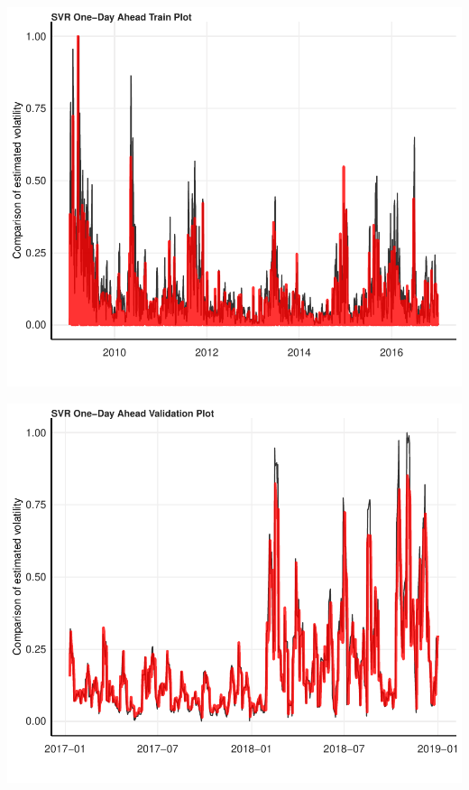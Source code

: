 \documentclass[11pt,preprint, authoryear]{elsarticle}
\let\origfigure\figure
\let\endorigfigure\endfigure
\renewenvironment{figure}[1][2] {
    \expandafter\origfigure\expandafter[H]
} {
    \endorigfigure
}
\numberwithin{equation}{section}
\numberwithin{figure}{section}
\numberwithin{table}{section}
\begin{document}
\begin{figure}[H]

{\centering \includegraphics{Essay_files/figure-latex/plot_5-1} 

}

\caption{SVR One-Day Ahead Training Forecast}\label{fig:plot_5}
\end{figure}

\begin{figure}[H]

{\centering \includegraphics{Essay_files/figure-latex/plot_6-1} 

}

\caption{SVR One-Day Ahead Validation Forecast}\label{fig:plot_6}
\end{figure}
\end{document}
